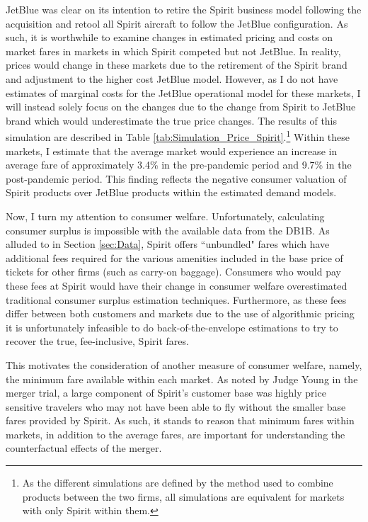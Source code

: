 \documentclass{article}
\begin{document}
     JetBlue was clear on its intention to retire the Spirit business model following the acquisition and retool all Spirit aircraft to follow the JetBlue configuration. As such, it is worthwhile to examine changes in estimated pricing and costs on market fares in markets in which Spirit competed but not JetBlue. In reality, prices would change in these markets due to the retirement of the Spirit brand and adjustment to the higher cost JetBlue model. However, as I do not have estimates of marginal costs for the JetBlue operational model for these markets, I will instead solely focus on the changes due to the change from Spirit to JetBlue brand which would underestimate the true price changes. The results of this simulation are described in Table \ref{tab:Simulation_Price_Spirit}.\footnote{As the different simulations are defined by the method used to combine products between the two firms, all simulations are equivalent for markets with only Spirit within them.} Within these markets, I estimate that the average market would experience an increase in average fare of approximately 3.4\% in the pre-pandemic period and 9.7\% in the post-pandemic period. This finding reflects the negative consumer valuation of Spirit products over JetBlue products within the estimated demand models.



     Now, I turn my attention to consumer welfare. Unfortunately, calculating consumer surplus is impossible with the available data from the DB1B. As alluded to in Section \ref{sec:Data}, Spirit offers ``unbundled" fares which have additional fees required for the various amenities included in the base price of tickets for other firms (such as carry-on baggage). Consumers who would pay these fees at Spirit would have their change in consumer welfare overestimated traditional consumer surplus estimation techniques. Furthermore, as these fees differ between both customers and markets due to the use of algorithmic pricing \citep{senate_permanent_committee_on_investigations_majority_2024} it is unfortunately infeasible to do back-of-the-envelope estimations to try to recover the true, fee-inclusive, Spirit fares. 
     
     This motivates the consideration of another measure of consumer welfare, namely, the minimum fare available within each market. As noted by Judge Young in the merger trial, a large component of Spirit's customer base was highly price sensitive travelers who may not have been able to fly without the smaller base fares provided by Spirit. As such, it stands to reason that minimum fares within markets, in addition to the average fares, are important for understanding the counterfactual effects of the merger. 
     
\end{document}

